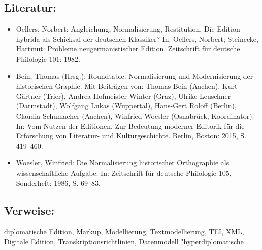 \documentclass{article}
\begin{document}
        \subsection*{Literatur:}\begin{itemize}\item Oellers, Norbert: Angleichung, Normalisierung, Restitution. Die Edition
                              hybrida als Schicksal der deutschen Klassiker? In: Oellers, Norbert; Steinecke, Hartmut: Probleme
                              neugermanistischer Edition. Zeitschrift für deutsche Philologie
                              101: 1982.\item Bein, Thomas (Hrsg.): Roundtable. Normalisierung und Modernisierung der
                              historischen Graphie. Mit Beiträgen von: Thomas Bein (Aachen), Kurt
                              Gärtner (Trier), Andrea Hofmeister-Winter (Graz), Ulrike Leuschner
                              (Darmstadt), Wolfgang Lukas (Wuppertal), Hans-Gert Roloff (Berlin),
                              Claudia Schumacher (Aachen), Winfried Woesler (Osnabrück,
                              Koordinator). In: Vom Nutzen der Editionen. Zur Bedeutung moderner
                              Editorik für die Erforschung von Literatur- und
                              Kulturgeschichte. Berlin, Boston: 2015, S. 419–460.\item Woesler, Winfried: Die Normalisierung historischer Orthographie als
                              wissenschaftliche Aufgabe. In: Zeitschrift für deutsche Philologie 105,
                              Sonderheft: 1986, S. 69–83.\end{itemize}\subsection*{Verweise:}\href{https://gams.uni-graz.at/o:konde.65}{diplomatische Edition}, \href{https://gams.uni-graz.at/o:konde.126}{Markup}, \href{https://gams.uni-graz.at/o:konde.137}{Modellierung}, \href{https://gams.uni-graz.at/o:konde.195}{Textmodellierung}, \href{https://gams.uni-graz.at/o:konde.178}{TEI}, \href{https://gams.uni-graz.at/o:konde.215}{XML}, \href{https://gams.uni-graz.at/o:konde.59}{Digitale Edition}, \href{https://gams.uni-graz.at/o:konde.198}{Transkriptionsrichtlinien}, \href{https://gams.uni-graz.at/o:konde.50}{Datenmodell "hyperdiplomatische
}
\end{document}

